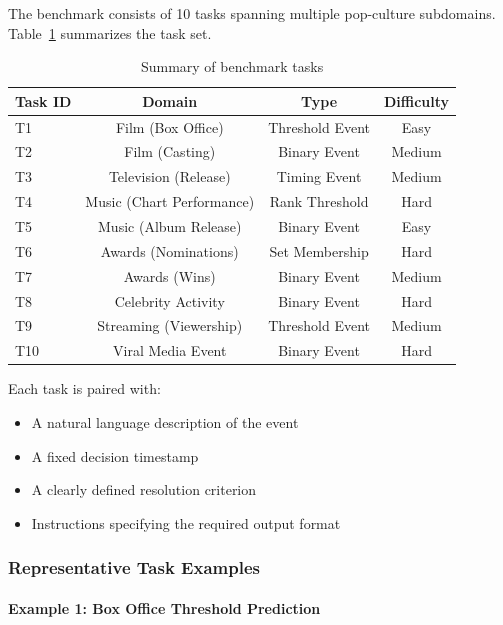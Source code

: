 \documentclass{article} %
\begin{document}
The benchmark consists of 10 tasks spanning multiple pop-culture subdomains. Table~\ref{tab:tasks} summarizes the task set.

\begin{table}[t]
\centering
\caption{Summary of benchmark tasks}
\label{tab:tasks}
\begin{tabular}{lccc}
\toprule
\textbf{Task ID} & \textbf{Domain} & \textbf{Type} & \textbf{Difficulty} \\
\midrule
T1 & Film (Box Office) & Threshold Event & Easy \\
T2 & Film (Casting) & Binary Event & Medium \\
T3 & Television (Release) & Timing Event & Medium \\
T4 & Music (Chart Performance) & Rank Threshold & Hard \\
T5 & Music (Album Release) & Binary Event & Easy \\
T6 & Awards (Nominations) & Set Membership & Hard \\
T7 & Awards (Wins) & Binary Event & Medium \\
T8 & Celebrity Activity & Binary Event & Hard \\
T9 & Streaming (Viewership) & Threshold Event & Medium \\
T10 & Viral Media Event & Binary Event & Hard \\
\bottomrule
\end{tabular}
\end{table}

Each task is paired with:
\begin{itemize}[noitemsep]
    \item A natural language description of the event
    \item A fixed decision timestamp
    \item A clearly defined resolution criterion
    \item Instructions specifying the required output format
\end{itemize}

\subsubsection{Representative Task Examples}

\paragraph{Example 1: Box Office Threshold Prediction}
\end{document}
